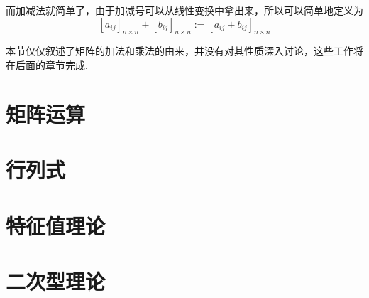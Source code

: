 \documentclass[main.tex]{subfiles}
\begin{document}
而加减法就简单了，由于加减号可以从线性变换中拿出来，所以可以简单地定义为
\[[a_{ij}]_{n\times n} \pm [b_{ij}]_{n \times n} := [a_{ij} \pm b_{ij}]_{n \times n}\]

本节仅仅叙述了矩阵的加法和乘法的由来，并没有对其性质深入讨论，这些工作将在后面的章节完成.

\section{矩阵运算}

\section{行列式}

\section{特征值理论}

\section{二次型理论}

	
	
	
\end{document}
